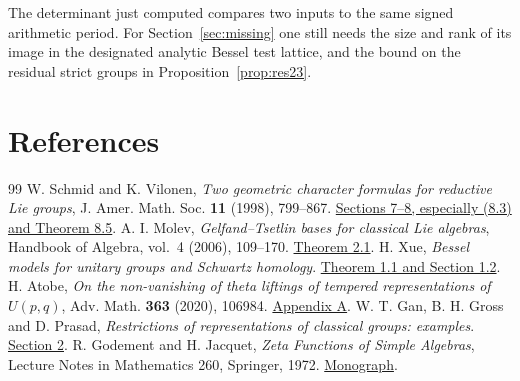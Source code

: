 \documentclass[a4paper,11pt]{article}
\theoremstyle{definition}
\theoremstyle{remark}
\numberwithin{equation}{section}
\begin{document}
The determinant just computed compares two inputs to the same
signed arithmetic period. For Section~\ref{sec:missing} one still
needs the size and rank of its image in the designated analytic
Bessel test lattice, and the bound on the residual strict groups
in Proposition~\ref{prop:res23}.

\clearpage
\section{References}\label{nav:bibliography-XVII}
\begingroup{}\begin{thebibliography}{99}\small
{} W. Schmid and K. Vilonen, \emph{Two geometric character formulas for reductive Lie groups}, J. Amer. Math. Soc. \textbf{11} (1998), 799--867. \href{https://arxiv.org/pdf/math/9801081}{Sections 7--8, especially (8.3) and Theorem 8.5}.
 A. I. Molev, \emph{Gelfand--Tsetlin bases for classical Lie algebras}, Handbook of Algebra, vol.~4 (2006), 109--170. \href{https://www.maths.usyd.edu.au/u/pubs/publist/preprints/2002/molev-18.pdf}{Theorem 2.1}.
 H. Xue, \emph{Bessel models for unitary groups and Schwartz homology}. \href{https://preprint.press.jhu.edu/ajm/sites/default/files/AJM-h-xue.pdf}{Theorem 1.1 and Section 1.2}.
 H. Atobe, \emph{On the non-vanishing of theta liftings of tempered representations of \(U(p,q)\)}, Adv. Math. \textbf{363} (2020), 106984. \href{https://eprints.lib.hokudai.ac.jp/repo/huscap/all/84508/}{Appendix A}.
 W. T. Gan, B. H. Gross and D. Prasad, \emph{Restrictions of representations of classical groups: examples}. \href{https://abel.math.harvard.edu/~gross/preprints/ggp-evidence4.pdf}{Section 2}.
 R. Godement and H. Jacquet, \emph{Zeta Functions of Simple Algebras}, Lecture Notes in Mathematics 260, Springer, 1972. \href{https://doi.org/10.1007/BFb0070263}{Monograph}.
\end{thebibliography}\endgroup
\end{document}
